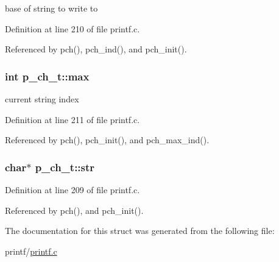 base of string to write to 



Definition at line 210 of file printf.\+c.



Referenced by pch(), pch\+\_\+ind(), and pch\+\_\+init().

\subsubsection[{\texorpdfstring{max}{max}}]{\setlength{\rightskip}{0pt plus 5cm}int p\+\_\+ch\+\_\+t\+::max}\hypertarget{structp__ch__t_a0dee9f28e498d427e53051b7e1846d34}{}\label{structp__ch__t_a0dee9f28e498d427e53051b7e1846d34}


current string index 



Definition at line 211 of file printf.\+c.



Referenced by pch(), pch\+\_\+init(), and pch\+\_\+max\+\_\+ind().

\subsubsection[{\texorpdfstring{str}{str}}]{\setlength{\rightskip}{0pt plus 5cm}char$\ast$ p\+\_\+ch\+\_\+t\+::str}\hypertarget{structp__ch__t_aa3c8616342a2717bc714bf1b6d00516f}{}\label{structp__ch__t_aa3c8616342a2717bc714bf1b6d00516f}


Definition at line 209 of file printf.\+c.



Referenced by pch(), and pch\+\_\+init().



The documentation for this struct was generated from the following file\+:\begin{DoxyCompactItemize}
\item 
printf/\hyperlink{printf_8c}{printf.\+c}\end{DoxyCompactItemize}

